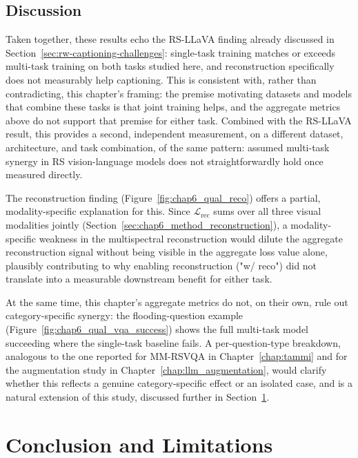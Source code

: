 \subsection{Discussion}
\label{sec:chap6_discussion}

Taken together, these results echo the RS-LLaVA finding already
discussed in Section~\ref{sec:rw-captioning-challenges}: single-task
training matches or exceeds multi-task training on both tasks studied
here, and reconstruction specifically does not measurably help
captioning. This is consistent with, rather than contradicting, this
chapter's framing: the premise motivating datasets and models that
combine these tasks is that joint training helps, and the aggregate
metrics above do not support that premise for either task. Combined
with the RS-LLaVA result, this provides a second, independent
measurement, on a different dataset, architecture, and task
combination, of the same pattern: assumed multi-task synergy in RS
vision-language models does not straightforwardly hold once measured
directly.

The reconstruction finding (Figure~\ref{fig:chap6_qual_reco}) offers a
partial, modality-specific explanation for this. Since
$\mathcal{L}_\text{rec}$ sums over all three visual modalities jointly
(Section~\ref{sec:chap6_method_reconstruction}), a modality-specific
weakness in the multispectral reconstruction would dilute the
aggregate reconstruction signal without being visible in the aggregate
loss value alone, plausibly contributing to why enabling reconstruction
("w/ reco") did not translate into a measurable downstream benefit for
either task.

At the same time, this chapter's aggregate metrics do not, on their
own, rule out category-specific synergy: the flooding-question example
(Figure~\ref{fig:chap6_qual_vqa_success}) shows the full multi-task
model succeeding where the single-task baseline fails. A per-question-type breakdown,
analogous to the one reported for MM-RSVQA in
Chapter~\ref{chap:tammi} and for the augmentation study in
Chapter~\ref{chap:llm_augmentation}, would clarify whether this
reflects a genuine category-specific effect or an isolated case, and
is a natural extension of this study, discussed further in
Section~\ref{sec:chap6_conclusion}.

\section{Conclusion and Limitations}
\label{sec:chap6_conclusion}

